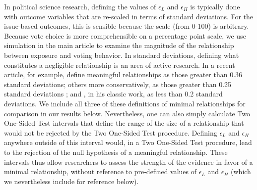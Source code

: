 \documentclass[
  12pt,
]{article}
\begin{document}
In political science research, defining the values of \(\epsilon_L\) and \(\epsilon_H\) is typically done with outcome variables that are re-scaled in terms of standard deviations. For the issue-based outcomes, this is sensible because the scale (from 0-100) is arbitrary. Because vote choice is more comprehensible on a percentage point scale, we use simulation in the main article to examine the magnitude of the relationship between exposure and voting behavior. In standard deviations, defining what constitutes a negligible relationship is an area of active research. In a recent article, for example, \citet{Hartman2018} define meaningful relationships as those greater than 0.36 standard deviations; others more conservatively, as those greater than 0.25 standard deviations \citep{Ho2007, Imbens2015}; and \citet{Cohen1969}, in his classic work, as less than 0.2 standard deviations. We include all three of these definitions of minimal relationships for comparison in our results below. Nevertheless, one can also simply calculate Two One-Sided Test intervals that define the range of the size of a relationship that would not be rejected by the Two One-Sided Test procedure. Defining \(\epsilon_L\) and \(\epsilon_H\) anywhere outside of this interval would, in a Two One-Sided Test procedure, lead to the rejection of the null hypothesis of a meaningful relationship. These intervals thus allow researchers to assess the strength of the evidence in favor of a minimal relationship, without reference to pre-defined values of \(\epsilon_L\) and \(\epsilon_H\) (which we nevertheless include for reference below).
\end{document}
